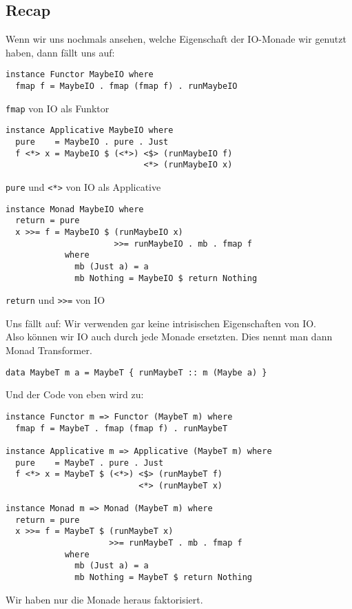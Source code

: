 \documentclass{beamer}
\begin{document}
\subsection{Recap}

\begin{frame}[fragile]
Wenn wir uns nochmals ansehen, welche Eigenschaft der IO-Monade wir genutzt haben, dann fällt uns auf:
\pause
\begin{verbatim}
instance Functor MaybeIO where
  fmap f = MaybeIO . fmap (fmap f) . runMaybeIO
\end{verbatim}
\texttt{fmap} von IO als Funktor
\pause
\begin{verbatim}
instance Applicative MaybeIO where
  pure    = MaybeIO . pure . Just
  f <*> x = MaybeIO $ (<*>) <$> (runMaybeIO f)
                            <*> (runMaybeIO x)
\end{verbatim}
\texttt{pure} und \texttt{<*>} von IO als Applicative
\pause
\begin{verbatim}
instance Monad MaybeIO where
  return = pure
  x >>= f = MaybeIO $ (runMaybeIO x)
                      >>= runMaybeIO . mb . fmap f
            where
              mb (Just a) = a
              mb Nothing = MaybeIO $ return Nothing
\end{verbatim}
\texttt{return} und \texttt{>>=} von IO
\end{frame}

\begin{frame}[fragile]
Uns fällt auf: Wir verwenden gar keine intrisischen Eigenschaften von IO.\\
Also können wir IO auch durch jede Monade ersetzten. Dies nennt man dann Monad Transformer.
\begin{verbatim}
data MaybeT m a = MaybeT { runMaybeT :: m (Maybe a) }
\end{verbatim}
\end{frame}

\begin{frame}[fragile]
Und der Code von eben wird zu:
\begin{verbatim}
instance Functor m => Functor (MaybeT m) where
  fmap f = MaybeT . fmap (fmap f) . runMaybeT

instance Applicative m => Applicative (MaybeT m) where
  pure    = MaybeT . pure . Just
  f <*> x = MaybeT $ (<*>) <$> (runMaybeT f)
                           <*> (runMaybeT x)

instance Monad m => Monad (MaybeT m) where
  return = pure
  x >>= f = MaybeT $ (runMaybeT x)
                     >>= runMaybeT . mb . fmap f
            where
              mb (Just a) = a
              mb Nothing = MaybeT $ return Nothing
\end{verbatim}
\pause
Wir haben nur die Monade heraus faktorisiert.
\end{frame}
\end{document}
